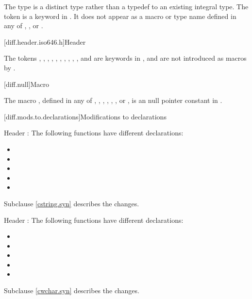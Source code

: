 \pnum
The type  is a distinct type rather than a typedef to an
existing integral type.
The token 
is a keyword in \Cpp{}.
It does not appear as a macro or type name defined in any of
,
,
or .

[diff.header.iso646.h]{Header }

\pnum
The tokens
,
,
,
,
,
,
,
,
,
,
and
are keywords in \Cpp{},
and are not introduced as macros
by .

[diff.null]{Macro }

\pnum
The macro
,
defined in any of
,
,
,
,
,
,
or ,
is an  null pointer constant in
\Cpp{}.

[diff.mods.to.declarations]{Modifications to declarations}

\pnum
Header :
The following functions have different declarations:

\begin{itemize}
\item {}
\item {}
\item {}
\item {}
\item {}
\end{itemize}

Subclause \ref{cstring.syn} describes the changes.

\pnum
Header :
The following functions have different declarations:

\begin{itemize}
\item {}
\item {}
\item {}
\item {}
\item {}
\end{itemize}

Subclause \ref{cwchar.syn} describes the changes.

